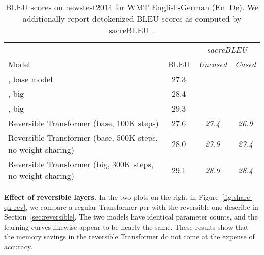 \documentclass{article} \usepackage{iclr2020_conference,times}
\renewcommand{\paragraph}[1]{\textbf{#1}}
\begin{document}
\begin{table}
\caption{BLEU scores on newstest2014 for WMT English-German (En–De). We additionally report detokenized BLEU scores as computed by sacreBLEU~\citep{sacrebleu}.}
\label{tab:wmt}
\begin{center}
\begin{tabular}{lccc}
&& \multicolumn{2}{c}{\textit{sacreBLEU}} \\
Model & BLEU & \textit{Uncased}\footnotemark[3] & \textit{Cased}\footnotemark[4] \\
\hline
\citet{transformer}, base model & 27.3 \\
\citet{transformer}, big & 28.4 \\
\citet{ott2018scaling}, big & 29.3 \\
\hline
Reversible Transformer (base, 100K steps) & 27.6 & \textit{27.4} & \textit{26.9} \\
Reversible Transformer (base, 500K steps, no weight sharing) & 28.0 & \textit{27.9} & \textit{27.4} \\
Reversible Transformer (big, 300K steps, no weight sharing) & 29.1 & \textit{28.9} & \textit{28.4}
\end{tabular}
\end{center}
\end{table}


\paragraph{Effect of reversible layers.} \label{sec:exp_rev}
In the two plots on the right in Figure~\ref{fig:share-qk-rev}, we compare a regular Transformer per \citet{transformer} with the reversible one describe in Section~\ref{sec:reversible}. The two models have identical parameter counts, and the learning curves likewise appear to be nearly the same. These results show that the memory savings in the reversible Transformer do not come at the expense of accuracy.
\end{document}
